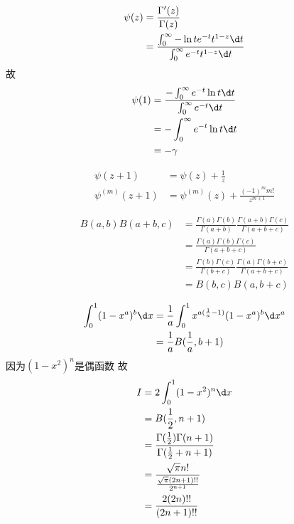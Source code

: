 \documentclass{phyasgn}
\begin{document}
\begin{sol}[1]
\begin{align*}
    \psi(z)&=\frac{\Gamma'(z)}{\Gamma(z)}\\
    &=\dfrac{\int_{0}^{\infty}-\ln te^{-t}t^{1-z}\d t}{\int_{0}^{\infty}e^{-t}t^{1-z}\d t}
\end{align*}
故
\begin{align*}
    \psi(1)&=\dfrac{-\int_{0}^{\infty}e^{-t}\ln t\d t}{\int_{0}^{\infty}e^{-t}\d t}\\
    &=-\int_{0}^{\infty}e^{-t}\ln t\d t\\
    &=-\gamma
\end{align*}
\end{sol}\par

\begin{sol}[2]
    \begin{align*}
        \psi(z+1)&=\psi(z)+\frac{1}{z}\\
        \psi^{(m)}(z+1)&=\psi^{(m)}(z)+\frac{(-1)^mm!}{z^{m+1}}
    \end{align*}
\end{sol}\par

\begin{pf}[3]
    \begin{align*}
       B(a,b)B(a+b,c)&=\frac{\Gamma(a)\Gamma(b)}{\Gamma(a+b)}\frac{\Gamma(a+b)\Gamma(c)}{\Gamma(a+b+c)}\\
       &=\frac{\Gamma(a)\Gamma(b)\Gamma(c)}{\Gamma(a+b+c)}\\
       &=\frac{\Gamma(b)\Gamma(c)}{\Gamma(b+c)}\frac{\Gamma(a)\Gamma(b+c)}{\Gamma(a+b+c)}\\
       &=B(b,c)B(a,b+c)
    \end{align*}
\end{pf}\par

\begin{sol}[4]
    \begin{align*}
        \int_{0}^{1}(1-x^a)^b\d x&=\frac{1}{a}\int_{0}^{1}x^{a(\frac{1}{a}-1)}(1-x^a)^{b}\d x^a\\
        &=\frac{1}{a}B(\frac{1}{a},b+1)
    \end{align*}
    因为$(1-x^2)^n$是偶函数
    故
    \begin{align*}
        I&=2\int_{0}^{1}(1-x^2)^n\d x\\
        &=B(\frac{1}{2},n+1)\\
        &=\frac{\Gamma(\frac{1}{2})\Gamma(n+1)}{\Gamma(\frac{1}{2}+n+1)}\\
        &=\frac{\sqrt{\pi}n!}{\frac{\sqrt{\pi}(2n+1)!!}{2^{n+1}}}\\
        &=\frac{2(2n)!!}{(2n+1)!!}
    \end{align*}
\end{sol}\par
\end{document}
